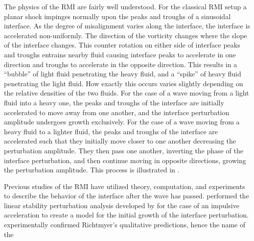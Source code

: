 The physics of the \ac{RMI} are fairly well understood. For the
classical \ac{RMI} setup a planar shock impinges normally upon the
peaks and troughs of a sinusoidal interface. As the degree of
misalignment varies along the interface, the interface is accelerated
non-uniformly. The direction of the vorticity changes where the slope
of the interface changes. This counter rotation on either side of
interface peaks and troughs entrains nearby fluid causing interface
peaks to accelerate in one direction and troughs to accelerate in the
opposite direction. This results in a ``bubble'' of light fluid
penetrating the heavy fluid, and a ``spike'' of heavy fluid
penetrating the light fluid. How exactly this occurs varies slightly
depending on the relative densities of the two fluids. For the case of
a wave moving from a light fluid into a heavy one, the peaks and
troughs of the interface are initially accelerated to move away from
one another, and the interface perturbation amplitude undergoes growth
exclusively. For the case of a wave moving from a heavy fluid to a
lighter fluid, the peaks and troughs of the interface are accelerated
such that they initially move closer to one another decreasing the
perturbation amplitude. They then pass one another, inverting the
phase of the interface perturbation, and then continue moving in
opposite directions, growing the perturbation amplitude. This process
is illustrated in \citep{Brouillette2002}.
\begin{comment}
  \begin{figure}
    \centering \def\svgwidth{0.9\textwidth}
    {brouillette_fig3_mod.pdf_tex} \hfill%
    \caption[A schematic view of the \ac{RMI} instability for a
    heavy-light interface]{Adapted from \cite{Brouillette2002}. The
      \ac{RMI} for a heavy-light interface is illustrated. The initial
      condition (left), circulation post wave-interface interaction
      (center), and perturbation growth (right) are shown.}
    \label{fig:rmi_schematic}
  \end{figure}
\end{comment}
Previous studies of the \ac{RMI} have utilized theory, computation,
and experiments to describe the behavior of the interface after the
wave has passed. \cite{Richtmyer1960} performed the linear stability
perturbation analysis developed by \cite{Taylor1950} for the case of
an impulsive acceleration to create a model for the initial growth of
the interface perturbation. \cite{Meshkov1969} experimentally
confirmed Richtmyer's qualitative predictions, hence the name of the
